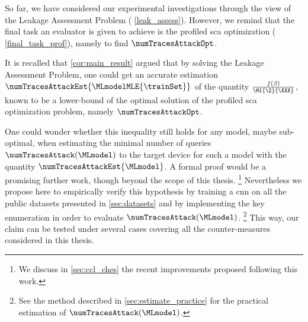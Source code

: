 So far, we have considered our experimental investigations through the view of the Leakage Assessment Problem (\ie{} \autoref{leak_assess}).
However, we remind that the final task an evaluator is given to achieve is the profiled \gls{sca} optimization (\ie{} \autoref{final_task_prof}), namely to find \(\numTracesAttackOpt\).

It is recalled that \autoref{cor:main_result} argued that by solving the Leakage Assessment Problem, one could get an accurate estimation \(\numTracesAttackEst{\MLmodelMLE{\trainSet}}\) of the quantity \(\frac{f(\beta)}{\MI{\Z}{\XXX}}\), known to be a lower-bound of the optimal solution of the profiled \gls{sca} optimization problem, namely \(\numTracesAttackOpt\).

One could wonder whether this inequality still holds for any model, maybe sub-optimal, \ie{} when estimating the minimal number of queries \(\numTracesAttack(\MLmodel)\) to the target device for such a model with the quantity \(\numTracesAttackEst{\MLmodel}\).
A formal proof would be a promising further work, though beyond the scope of this thesis.%
\footnote{
    We discuss in \autoref{sec:ccl_ches} the recent improvements proposed following this work.
}
Nevertheless we propose here to empirically verify this hypothesis by training a \gls{cnn} on all the public datasets presented in \autoref{sec:datasets} and by implementing the key enumeration in order to evaluate \(\numTracesAttack(\MLmodel)\).%
\footnote{
    See the method described in \autoref{sec:estimate_practice} for the practical estimation of \(\numTracesAttack(\MLmodel)\).
}
This way, our claim can be tested under several cases covering all the counter-measures considered in this thesis.

